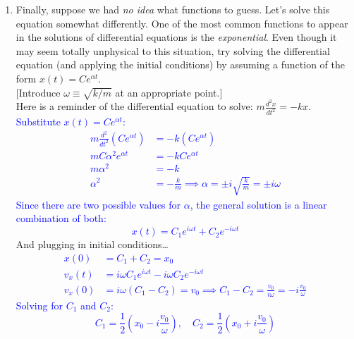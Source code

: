 \documentclass[11pt, letterpaper, openany]{book}
\newenvironment{exercise}[1][Exercise]{%
  \tcolorbox[blanker, breakable, left=1em,
    before skip=1em, after skip=1em,
    borderline west={3pt}{0pt}{PhysNavy},
    colback=PhysCream,
    before upper={\textcolor{PhysNavy}{\sffamily\bfseries #1:}\space}
  ]%
}{%
  \endtcolorbox%
}
\begin{document}
\begin{exercise}[Exercise 4]
\begin{enumerate}[label=(\alph*)]
    \item Finally, suppose we had \textit{no idea} what functions to guess. Let's solve this equation somewhat differently. One of the most common functions to appear in the solutions of differential equations is the \textit{exponential}. Even though it may seem totally unphysical to this situation, try solving the differential equation (and applying the initial conditions) by assuming a function of the form $x(t) = Ce^{\alpha t}$. \\
    $[$Introduce $\omega \equiv \sqrt{k/m}$ at an appropriate point.$]$ \\
    Here is a reminder of the differential equation to solve: $m\frac{d^2x}{dt^2} = -kx$. \\
    \textcolor{blue}{
    Substitute $x(t) = Ce^{\alpha t}$:
    \begin{align*}
        m\frac{d^2}{dt^2}\left( Ce^{\alpha t} \right) &= -k\left( Ce^{\alpha t} \right) \\
        mC\alpha^2 e^{\alpha t} &= -kCe^{\alpha t} \\
        m\alpha^2 &= -k \\
        \alpha^2 &= -\frac{k}{m} \implies \alpha = \pm i\sqrt{\frac{k}{m}} = \pm i\omega
    \end{align*}
    Since there are two possible values for $\alpha$, the general solution is a linear combination of both:
    \[ x(t) = C_1 e^{i\omega t} + C_2 e^{-i\omega t} \]
    }
    And plugging in initial conditions\dots \\
    \textcolor{blue}{
    \begin{align*}
        x(0) &= C_1 + C_2 = x_0 \\
        v_x(t) &= i\omega C_1 e^{i\omega t} - i\omega C_2 e^{-i\omega t} \\
        v_x(0) &= i\omega(C_1 - C_2) = v_0 \implies C_1 - C_2 = \frac{v_0}{i\omega} = -i\frac{v_0}{\omega}
    \end{align*}
    Solving for $C_1$ and $C_2$:
    \[ C_1 = \frac{1}{2}\left( x_0 - i\frac{v_0}{\omega} \right), \quad C_2 = \frac{1}{2}\left( x_0 + i\frac{v_0}{\omega} \right) \]
    }
    

\end{enumerate}
\end{exercise}
\end{document}
